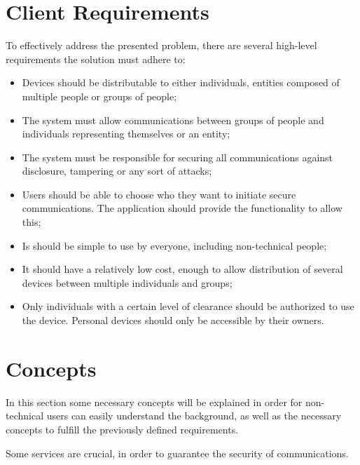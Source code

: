 \section{Client Requirements} \label{chap:problem:requirements}


To effectively address the presented problem, there are several high-level requirements the solution must adhere to:
\begin{itemize}
	\item Devices should be distributable to either individuals, entities composed of multiple people or groups of people;
	\item The system must allow communications between groups of people and individuals representing themselves or an entity;
	\item The system must be responsible for securing all communications against disclosure, tampering or any sort of attacks;
	\item Users should be able to choose who they want to initiate secure communications. The application should provide the functionality to allow this;
	\item Is should be simple to use by everyone, including non-technical people;
	\item It should have a relatively low cost, enough to allow distribution of several devices between multiple individuals and groups;
	\item Only individuals with a certain level of clearance should be authorized to use the device. Personal devices should only be accessible by their owners.
\end{itemize}

\section{Concepts} \label{chap:problem:concepts}

In this section some necessary concepts will be explained in order for non-technical users can easily understand the background, as well as the necessary concepts to fulfill the previously defined requirements.

Some services are crucial, in order to guarantee the security of communications.

